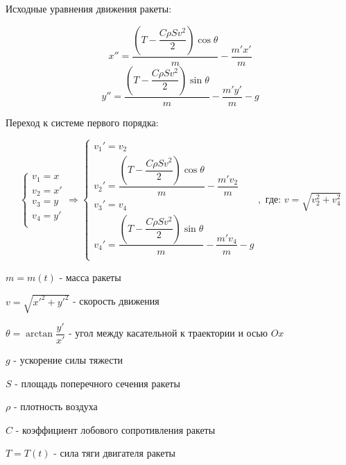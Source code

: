 \documentclass[a4paper, 12pt]{article}
\theoremstyle{definition}
\begin{document}
Исходные уравнения движения ракеты:

$$
    x'' = \dfrac{(T - \dfrac{C\rho S v^2}{2})\cos{\theta}}{m} - \dfrac{m'x'}{m}
$$
$$
    y'' = \dfrac{(T - \dfrac{C\rho S v^2}{2})\sin{\theta}}{m} - \dfrac{m'y'}{m} - g
$$

Переход к системе первого порядка:

$$
    \begin{cases}
        v_1 = x  \\
        v_2 = x' \\
        v_3 = y  \\
        v_4 = y' \\
    \end{cases} \Rightarrow  \begin{cases}
        v_1' = v_2                                                                  \\
        v_2' = \dfrac{(T - \dfrac{C\rho S v^2}{2})\cos{\theta}}{m} - \dfrac{m' v_2}{m} \\
        v_3' = v_4                                                                  \\
        v_4' = \dfrac{(T - \dfrac{C\rho S v^2}{2})\sin{\theta}}{m} - \dfrac{m' v_4}{m} - g \\
    \end{cases}, \text{ где: } v = \sqrt{v_2^2 + v_4^2}
$$

\vspace{5cm}


$m = m(t)$ - масса ракеты\par
$v = \sqrt{x'^2 + y'^2}$ - скорость движения\par
$\theta = \arctan{\dfrac{y'}{x'}}$ - угол между касательной к траектории и осью $Ox$\par
$g$ - ускорение силы тяжести\par
$S$ - площадь поперечного сечения ракеты\par
$\rho$ - плотность воздуха\par
$C$ - коэффициент лобового сопротивления ракеты\par
$T = T(t)$ - сила тяги двигателя ракеты
\end{document}
